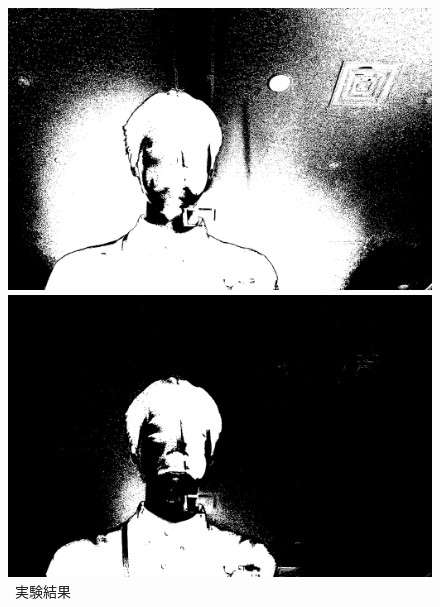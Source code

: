 \begin{figure}[h]
\begin{minipage}[b]{.49\textwidth}
\begin{minipage}[b]{.3\textwidth}
        \end{minipage}
        \caption{\kadaiaf\ 実験結果}
    \end{minipage}
    \nextfloat
    \begin{minipage}[b]{.49\textwidth}
        \centering
        \begin{minipage}[b]{.3\textwidth}
            \centering
            \includegraphics[keepaspectratio,width=\textwidth]{../../Figures/05_61.png}
        \end{minipage}
        \begin{minipage}[b]{.3\textwidth}
            \centering
            \includegraphics[keepaspectratio,width=\textwidth]{../../Figures/05_62.png}
        \end{minipage}
        \begin{minipage}[b]{.3\textwidth}

\end{minipage}
\end{minipage}
\end{figure}

